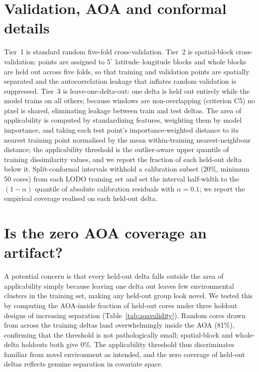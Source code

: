 \documentclass[10pt]{extarticle}
\begin{document}
\section{Validation, AOA and conformal details}
Tier~1 is standard random five-fold cross-validation. Tier~2 is spatial-block
cross-validation: points are assigned to $5^{\circ}$ latitude--longitude blocks and whole
blocks are held out across five folds, so that training and validation points are
spatially separated and the autocorrelation leakage that inflates random validation is
suppressed. Tier~3 is leave-one-delta-out: one delta is held out entirely while the model
trains on all others; because windows are non-overlapping (criterion C5) no pixel is
shared, eliminating leakage between train and test deltas. The area of applicability is
computed by standardizing features, weighting them by model importance, and taking each
test point's importance-weighted distance to its nearest training point normalised by the
mean within-training nearest-neighbour distance; the applicability threshold is the
outlier-aware upper quantile of training dissimilarity values, and we report the fraction
of each held-out delta below it. Split-conformal intervals withhold a calibration subset
(20\%, minimum 50 cores) from each LODO training set and set the interval half-width to
the $(1-\alpha)$ quantile of absolute calibration residuals with $\alpha=0.1$; we report
the empirical coverage realised on each held-out delta.

\section{Is the zero AOA coverage an artifact?}
\label{si:aoa}
A potential concern is that every held-out delta falls outside the area of applicability
simply because leaving one delta out leaves few environmental clusters in the training
set, making any held-out group look novel. We tested this by computing the AOA-inside
fraction of held-out cores under three holdout designs of increasing separation
(Table~\ref{tab:aoavalidity}). Random cores drawn from across the training deltas land
overwhelmingly inside the AOA (81\%), confirming that the threshold is not pathologically
small; spatial-block and whole-delta holdouts both give 0\%. The applicability threshold
thus discriminates familiar from novel environment as intended, and the zero coverage of
held-out deltas reflects genuine separation in covariate space.
\end{document}
